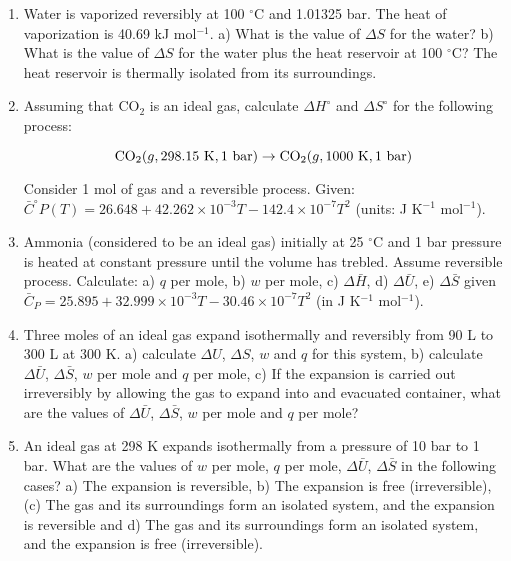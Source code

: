 \begin{enumerate}

\item Water is vaporized reversibly at 100 $^\circ$C and 1.01325 bar. The heat of vaporization is 40.69 kJ mol$^{-1}$. a) What is the value of $\Delta S$ for the water? b) What is the value of $\Delta S$ for the water plus the heat reservoir at 100 $^\circ$C? The heat reservoir is thermally isolated from its surroundings.


\item Assuming that CO$_2$ is an ideal gas, calculate $\Delta H^\circ$ and $\Delta S^\circ$ for the following process:

$$\textnormal{CO}_2(g, 298.15\textnormal{ K}, 1\textnormal{ bar}) \rightarrow \textnormal{CO}_2(g, 1000\textnormal{ K}, 1\textnormal{ bar})$$

Consider 1 mol of gas and a reversible process. Given: $\bar{C}^\circ P(T) = 26.648 + 42.262 \times 10^{-3}T - 142.4 \times 10^{-7}T^2$ (units: J K$^{-1}$ mol$^{-1}$).


\item Ammonia (considered to be an ideal gas) initially at 25 $^\circ$C and 1 bar pressure is heated at constant pressure until the volume has trebled. Assume reversible process. Calculate: a) $q$ per mole, b) $w$ per mole, c) $\Delta\bar{H}$, d) $\Delta\bar{U}$, e) $\Delta\bar{S}$ given $\bar{C}_P = 25.895 + 32.999\times 10^{-3}T - 30.46\times 10^{-7}T^2$ (in J K$^{-1}$ mol$^{-1}$).


\item Three moles of an ideal gas expand isothermally and reversibly from 90 L to 300 L at 300 K. a) calculate $\Delta U$, $\Delta S$, $w$ and $q$ for this system, b) calculate $\Delta\bar{U}$, $\Delta\bar{S}$, $w$ per mole and $q$ per mole, c) If the expansion is carried out irreversibly by allowing the gas to expand into and evacuated container, what are the values of $\Delta\bar{U}$, $\Delta\bar{S}$, $w$ per mole and $q$ per mole?


\item An ideal gas at 298 K expands isothermally from a pressure of 10 bar to 1 bar. What are the values of $w$ per mole, $q$ per mole, $\Delta\bar{U}$, $\Delta\bar{S}$ in the following cases? a) The expansion is reversible, b) The expansion is free (irreversible), (c) The gas and its surroundings form an isolated system, and the expansion is reversible and d) The gas and its surroundings form an isolated system, and the expansion is free (irreversible).


\end{enumerate}
